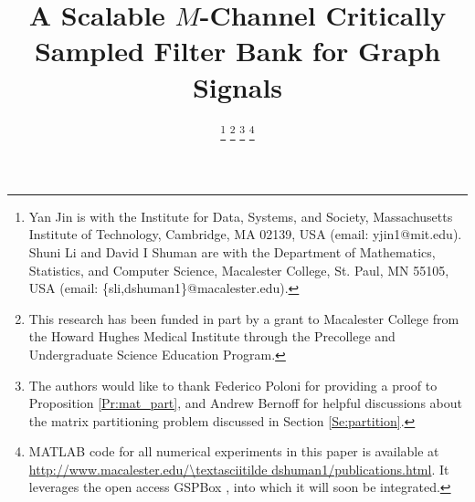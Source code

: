 \documentclass[journal, 10pt]{IEEEtran}
\begin{document}
\title{
A Scalable $M$-Channel Critically Sampled Filter Bank for Graph Signals 
}
\author{
\thanks{Yan Jin is with the Institute for Data, Systems, and Society, Massachusetts Institute of Technology, Cambridge, MA 02139, USA (email: yjin1@mit.edu). Shuni Li and David I Shuman are with the Department of Mathematics, Statistics, and Computer Science, Macalester College, St. Paul, MN 55105, USA (email: \{sli,dshuman1\}@macalester.edu).  }
\thanks{This research has been funded in part by a grant to Macalester College from the Howard Hughes Medical Institute through the Precollege and Undergraduate Science Education Program.}
\thanks{The authors would like to thank Federico Poloni for providing a proof to Proposition \ref{Pr:mat_part}, and Andrew Bernoff for helpful discussions about the matrix partitioning problem discussed in Section \ref{Se:partition}.}
\thanks{MATLAB code for all numerical experiments in this paper is available at \url{http://www.macalester.edu/\textasciitilde dshuman1/publications.html}. It leverages the open access GSPBox \cite{gspbox}, into which it will soon be integrated.}}

\maketitle

\end{document}
